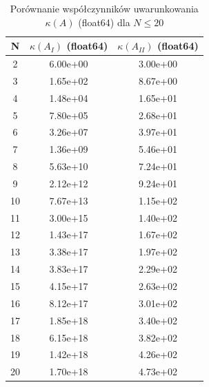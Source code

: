\begin{table}[htbp]
\centering
\caption{Porównanie współczynników uwarunkowania $\kappa(A)$ (float64) dla $N \le 20$ \label{tab:table_cond_compare}}
\begin{tabular}{ccc}
\toprule
N & $\kappa(A_I)$ (float64) & $\kappa(A_{II})$ (float64) \\
\midrule
2 & 6.00e+00 & 3.00e+00 \\
3 & 1.65e+02 & 8.67e+00 \\
4 & 1.48e+04 & 1.65e+01 \\
5 & 7.80e+05 & 2.68e+01 \\
6 & 3.26e+07 & 3.97e+01 \\
7 & 1.36e+09 & 5.46e+01 \\
8 & 5.63e+10 & 7.24e+01 \\
9 & 2.12e+12 & 9.24e+01 \\
10 & 7.67e+13 & 1.15e+02 \\
11 & 3.00e+15 & 1.40e+02 \\
12 & 1.43e+17 & 1.67e+02 \\
13 & 3.38e+17 & 1.97e+02 \\
14 & 3.83e+17 & 2.29e+02 \\
15 & 4.15e+17 & 2.63e+02 \\
16 & 8.12e+17 & 3.01e+02 \\
17 & 1.85e+18 & 3.40e+02 \\
18 & 6.15e+18 & 3.82e+02 \\
19 & 1.42e+18 & 4.26e+02 \\
20 & 1.70e+18 & 4.73e+02 \\
\bottomrule
\end{tabular}
\end{table}
